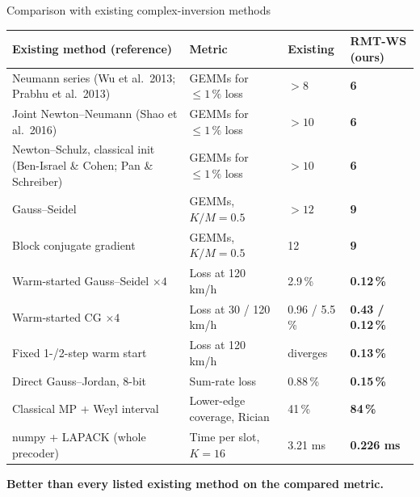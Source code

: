\documentclass[aspectratio=169,11pt,xcolor=table]{beamer}
\newcommand{\best}[1]{\textbf{\textcolor{good}{#1}}}
\newcommand{\takeaway}[1]{%
  \vfill
  \begin{alertblock}{}\centering\textbf{#1}\end{alertblock}}
\begin{document}
\begin{frame}{Comparison with existing complex-inversion methods}
  \centering
  \scriptsize\setlength{\tabcolsep}{4pt}
  \begin{tabular}{>{\raggedright}p{}>{\raggedright}p{}>{\raggedright}p{}p{}}
    \toprule
    Existing method (reference) & Metric & Existing & \textbf{RMT-WS (ours)} \\
    \midrule
    Neumann series (Wu et al.\ 2013; Prabhu et al.\ 2013) & GEMMs for $\le 1\,\%$ loss & $>8$ & \best{6} \\
    Joint Newton--Neumann (Shao et al.\ 2016) & GEMMs for $\le 1\,\%$ loss & $>10$ & \best{6} \\
    Newton--Schulz, classical init (Ben-Israel \& Cohen; Pan \& Schreiber) & GEMMs for $\le 1\,\%$ loss & $>10$ & \best{6} \\
    Gauss--Seidel & GEMMs, $K/M = 0.5$ & $>12$ & \best{9} \\
    Block conjugate gradient & GEMMs, $K/M = 0.5$ & 12 & \best{9} \\
    Warm-started Gauss--Seidel $\times 4$ & Loss at 120 km/h & 2.9\,\% & \best{0.12\,\%} \\
    Warm-started CG $\times 4$ & Loss at 30 / 120 km/h & 0.96 / 5.5\,\% & \best{0.43 / 0.12\,\%} \\
    Fixed 1-/2-step warm start & Loss at 120 km/h & diverges & \best{0.13\,\%} \\
    Direct Gauss--Jordan, 8-bit & Sum-rate loss & 0.88\,\% & \best{0.15\,\%} \\
    Classical MP + Weyl interval & Lower-edge coverage, Rician & 41\,\% & \best{84\,\%} \\
    numpy + LAPACK (whole precoder) & Time per slot, $K=16$ & 3.21 ms & \best{0.226 ms} \\
    \bottomrule
  \end{tabular}
  \takeaway{Better than every listed existing method on the compared metric.}
\end{frame}
\end{document}
